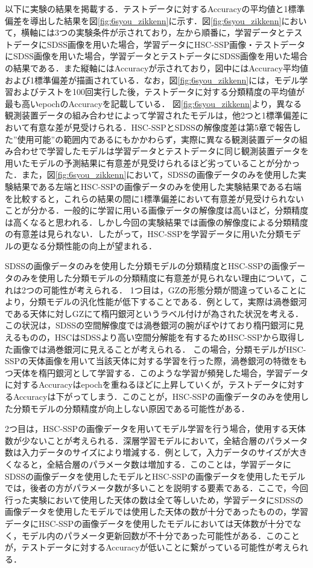 \documentclass[a4j, 11pt]{jreport}
\begin{document}
以下に実験の結果を掲載する．テストデータに対するAccuracyの平均値と1標準偏差を導出した結果を図\ref{fig:6syou_zikkenn}に示す．図\ref{fig:6syou_zikkenn}において，横軸には3つの実験条件が示されており，左から順番に，学習データとテストデータにSDSS画像を用いた場合，学習データにHSC-SSP画像・テストデータにSDSS画像を用いた場合，学習データとテストデータにSDSS画像を用いた場合の結果である．また縦軸にはAccuracyが示されており，図中にはAccuracy平均値および1標準偏差が描画されている．なお，図\ref{fig:6syou_zikkenn}には，モデル学習およびテストを100回実行した後，テストデータに対する分類精度の平均値が最も高いepochのAccuracyを記載している．
図\ref{fig:6syou_zikkenn}より，異なる観測装置データの組み合わせによって学習されたモデルは，他2つと1標準偏差において有意な差が見受けられる．HSC-SSPとSDSSの解像度差は第5章で報告した''使用可能''の範囲内であるにもかかわらず，実際に異なる観測装置データの組み合わせで学習したモデルは学習データとテストデータに同じ観測装置データを用いたモデルの予測結果に有意差が見受けられるほど劣っていることが分かった．また，図\ref{fig:6syou_zikkenn}において，SDSSの画像データのみを使用した実験結果である左端とHSC-SSPの画像データのみを使用した実験結果である右端を比較すると，これらの結果の間に1標準偏差において有意差が見受けられないことが分かる．一般的に学習に用いる画像データの解像度は高いほど，分類精度は高くなると思われる．しかし今回の実験結果では画像の解像度による分類精度の有意差は見られない．したがって，HSC-SSPを学習データに用いた分類モデルの更なる分類性能の向上が望まれる．

SDSSの画像データのみを使用した分類モデルの分類精度とHSC-SSPの画像データのみを使用した分類モデルの分類精度に有意差が見られない理由について，これは2つの可能性が考えられる．
1つ目は，GZの形態分類が間違っていることにより，分類モデルの汎化性能が低下することである．例として，実際は渦巻銀河である天体に対しGZにて楕円銀河というラベル付けが為された状況を考える．この状況は，SDSSの空間解像度では渦巻銀河の腕がぼやけており楕円銀河に見えるものの，HSCはSDSSより高い空間分解能を有するためHSC-SSPから取得した画像では渦巻銀河に見えることが考えられる．
この場合，分類モデルがHSC-SSPの天体画像を用いて当該天体に対する学習を行った際，渦巻銀河の特徴をもつ天体を楕円銀河として学習する．このような学習が頻発した場合，学習データに対するAccuracyはepochを重ねるほどに上昇していくが，テストデータに対するAccuracyは下がってしまう．このことが，HSC-SSPの画像データのみを使用した分類モデルの分類精度が向上しない原因である可能性がある．

2つ目は，HSC-SSPの画像データを用いてモデル学習を行う場合，使用する天体数が少ないことが考えられる．深層学習モデルにおいて，全結合層のパラメータ数は入力データのサイズにより増減する．例として，入力データのサイズが大きくなると，全結合層のパラメータ数は増加する．このことは，学習データにSDSSの画像データを使用したモデルとHSC-SSPの画像データを使用したモデルでは，後者の方がパラメータ数が多いことを説明する要素である．ここで，今回行った実験において使用した天体の数は全て等しいため，学習データにSDSSの画像データを使用したモデルでは使用した天体の数が十分であったものの，学習データにHSC-SSPの画像データを使用したモデルにおいては天体数が十分でなく，モデル内のパラメータ更新回数が不十分であった可能性がある．このことが，テストデータに対するAccuracyが低いことに繋がっている可能性が考えられる．
\end{document}
